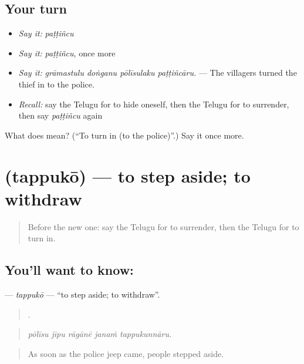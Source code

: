 \subsection*{Your turn}
\begin{itemize}
\raggedright
  \item \emph{Say it:} \emph{paṭṭiñcu}
  \item \emph{Say it:} \emph{paṭṭiñcu}, once more
  \item \emph{Say it:} \emph{grāmastulu doṅganu pōlīsulaku paṭṭiñcāru.} — The villagers turned the thief in to the police.
  \item \emph{Recall:} say the Telugu for to hide oneself, then the Telugu for to surrender, then say \emph{paṭṭiñcu} again
\end{itemize}

\begin{tcolorbox}[breakable,colback=teal!4,colframe=teal!35!black,title={Before you move on}]
What does  mean? (\textquotedblleft{}To turn in (to the police)\textquotedblright{}.) Say it once more.
\end{tcolorbox}
\section[\texorpdfstring{\te{తప్పుకో} (tappukō)}{తప్పుకో (tappukō)}]{ (tappukō) — to step aside; to withdraw}

\label{lesson:TE-C352-tappuko}



\begin{quote}
Before the new one: say the Telugu for to surrender, then the Telugu for to turn in.
\end{quote}

\subsection*{You'll want to know: }
\textbf{} — \emph{tappukō} — \textquotedblleft{}to step aside; to withdraw\textquotedblright{}.

\begin{quote}
    .
\end{quote}

\begin{quote}
\emph{pōlīsu jīpu rāgānē janaṁ tappukunnāru.}
\end{quote}

\begin{quote}
As soon as the police jeep came, people stepped aside.
\end{quote}

